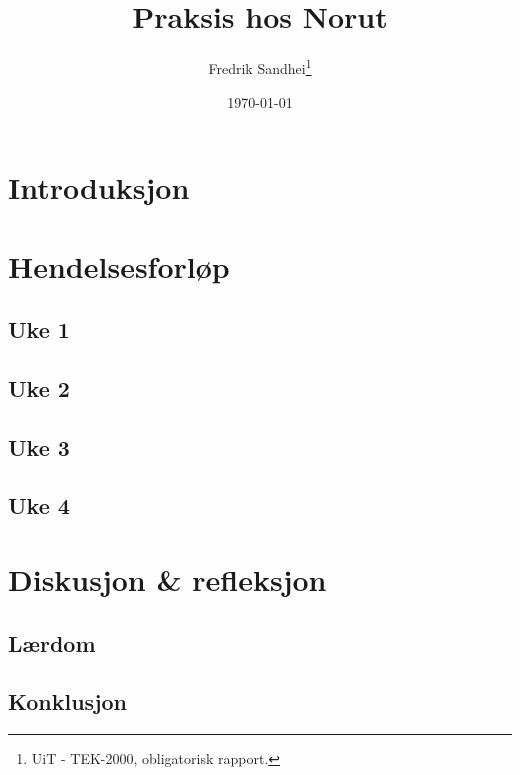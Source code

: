 \documentclass[11pt, a4paper]{report}
\begin{document}
\title{\\Praksis hos Norut}
\author{Fredrik Sandhei\thanks{UiT - TEK-2000, obligatorisk rapport.}}

\date{\today}
\maketitle
\newpage
\tableofcontents
\newpage

\section{Introduksjon}
\section{Hendelsesforløp}
\subsection{Uke 1}
\subsection{Uke 2}
\subsection{Uke 3}
\subsection{Uke 4}

\section{Diskusjon \& refleksjon}
\subsection{Lærdom}


\subsection{Konklusjon}
\end{document}
